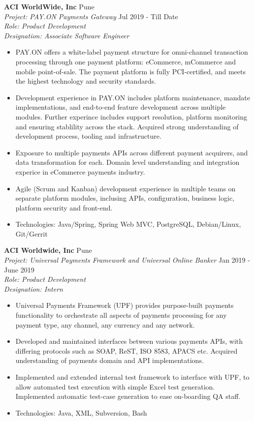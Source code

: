 \documentclass[a4paper]{article}
\begin{document}
\textbf{ACI WorldWide, Inc} \hfill Pune\\
\textit{Project: PAY.ON Payments Gateway} \hfill Jul 2019 - Till Date\\
\textit{Role: Product Development} \\
\textit{Designation: Associate Software Engineer}
\vspace{-1mm}
\begin{itemize} \itemsep 1pt
	\item PAY.ON offers a white-label payment structure for omni-channel transaction processing through one payment platform: eCommerce, mCommerce and mobile point-of-sale. The payment platform is fully PCI-certified, and meets the highest technology and security standards.
	\item Development experience in PAY.ON includes platform maintenance, mandate implementations, and end-to-end feature development across multiple modules. Further experince includes support resolution, platform monitoring and ensuring stablility across the stack. Acquired strong understanding of development process, tooling and infrastructure.
    \item Exposure to multiple payments APIs across different payment acquirers, and data transformation for each. Domain level understanding and integration experice in eCommerce payments industry.
    \item Agile (Scrum and Kanban) development experience in multiple teams on separate platform modules, inclusing APIs, configuration, business logic, platform security and front-end.
	\item Technologies: Java/Spring, Spring Web MVC, PostgreSQL, Debian/Linux, Git/Gerrit
\end{itemize}

\textbf{ACI Worldwide, Inc}  \hfill Pune\\
\textit{Project: Universal Payments Framework and Universal Online Banker } \hfill Jan 2019 - June 2019\\
\textit{Role: Product Development} \\
\textit{Designation: Intern} \\
\vspace{-1mm}
\begin{itemize} \itemsep 1pt
	\item Universal Payments Framework (UPF) provides purpose-built payments functionality to orchestrate all aspects of payments processing for any payment type, any channel, any currency and any network.
	\item Developed and maintained interfaces between various payments APIs, with differing protocols such as SOAP, ReST, ISO 8583, APACS etc. Acquired understanding of payments domain and API implementations.
	\item Implemented and extended internal test framework to interface with UPF, to allow automated test execution with simple Excel test generation. Implemented automatic test-case generation to ease on-boarding QA staff.
	\item Technologies: Java, XML, Subversion, Bash
\end{itemize}
\end{document}
